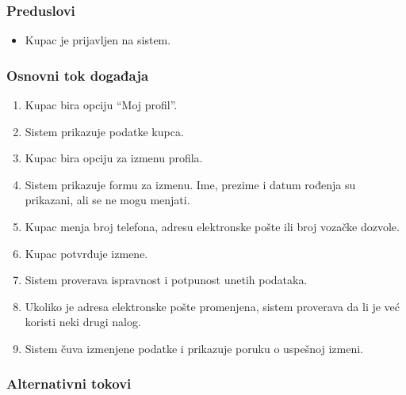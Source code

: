 \documentclass[a4paper,12pt]{article}
\begin{document}
\subsubsection{Preduslovi}

\begin{itemize}
    \item Kupac je prijavljen na sistem.
\end{itemize}

\subsubsection{Osnovni tok događaja}

\begin{enumerate}
    \item Kupac bira opciju \enquote{Moj profil}.
    \item Sistem prikazuje podatke kupca.
    \item Kupac bira opciju za izmenu profila.
    \item Sistem prikazuje formu za izmenu. Ime, prezime i datum rođenja su prikazani, ali se ne mogu menjati.
    \item Kupac menja broj telefona, adresu elektronske pošte ili broj vozačke dozvole.
    \item Kupac potvrđuje izmene.
    \item Sistem proverava ispravnost i potpunost unetih podataka.
    \item Ukoliko je adresa elektronske pošte promenjena, sistem proverava da li je već koristi neki drugi nalog.
    \item Sistem čuva izmenjene podatke i prikazuje poruku o uspešnoj izmeni.
\end{enumerate}

\subsubsection{Alternativni tokovi}
\end{document}
